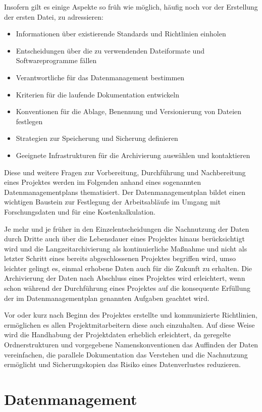 \documentclass[a4paper]{report}
\begin{document}
Insofern gilt es einige Aspekte so früh wie möglich, häufig noch vor der Erstellung der ersten Datei, zu adressieren:
\begin{itemize}
\item Informationen über existierende Standards und Richtlinien einholen
\item Entscheidungen über die zu verwendenden Dateiformate und Softwareprogramme fällen
\item Verantwortliche für das Datenmanagement bestimmen
\item Kriterien für die laufende Dokumentation entwickeln
\item Konventionen für die Ablage, Benennung und Versionierung von Dateien festlegen
\item Strategien zur Speicherung und Sicherung definieren
\item Geeignete Infrastrukturen für die Archivierung auswählen und kontaktieren
\end{itemize}

Diese und weitere Fragen zur Vorbereitung, Durchführung und Nachbereitung eines Projektes werden im Folgenden anhand eines sogenannten Datenmanagementplans thematisiert. Der Datenmanagementplan bildet einen wichtigen Baustein zur Festlegung der Arbeitsabläufe im Umgang mit Forschungsdaten und für eine Kostenkalkulation.

Je mehr und je früher in den Einzelentscheidungen die Nachnutzung der Daten durch Dritte auch über die Lebensdauer eines Projektes hinaus berücksichtigt wird und die Langzeitarchivierung als kontinuierliche Maßnahme und nicht als letzter Schritt eines bereits abgeschlossenen Projektes begriffen wird, umso leichter gelingt es, einmal erhobene Daten auch für die Zukunft zu erhalten. Die Archivierung der Daten nach Abschluss eines Projektes wird erleichtert, wenn schon während der Durchführung eines Projektes auf die konsequente Erfüllung der im Datenmanagementplan genannten Aufgaben geachtet wird.

Vor oder kurz nach Beginn des Projektes erstellte und kommunizierte Richtlinien, ermöglichen es allen Projektmitarbeitern diese auch einzuhalten. Auf diese Weise wird die Handhabung der Projektdaten erheblich erleichtert, da geregelte Ordnerstrukturen und vorgegebene Namenskonventionen das Auffinden der Daten vereinfachen, die parallele Dokumentation das Verstehen und die Nachnutzung ermöglicht und Sicherungskopien das Risiko eines Datenverlustes reduzieren.

\newpage
\section{Datenmanagement}\label{datenmanagement}
	
	
\end{document}
